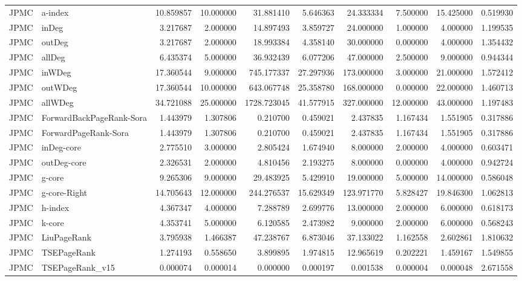 \begin{tabular}{llrrrrrrrr}
JPMC & a-index & 10.859857 & 10.000000 & 31.881410 & 5.646363 & 24.333334 & 7.500000 & 15.425000 & 0.519930 \\
JPMC & inDeg & 3.217687 & 2.000000 & 14.897493 & 3.859727 & 24.000000 & 1.000000 & 4.000000 & 1.199535 \\
JPMC & outDeg & 3.217687 & 2.000000 & 18.993384 & 4.358140 & 30.000000 & 0.000000 & 4.000000 & 1.354432 \\
JPMC & allDeg & 6.435374 & 5.000000 & 36.932439 & 6.077206 & 47.000000 & 2.500000 & 9.000000 & 0.944344 \\
JPMC & inWDeg & 17.360544 & 9.000000 & 745.177337 & 27.297936 & 173.000000 & 3.000000 & 21.000000 & 1.572412 \\
JPMC & outWDeg & 17.360544 & 10.000000 & 643.067748 & 25.358780 & 168.000000 & 0.000000 & 22.000000 & 1.460713 \\
JPMC & allWDeg & 34.721088 & 25.000000 & 1728.723045 & 41.577915 & 327.000000 & 12.000000 & 43.000000 & 1.197483 \\
JPMC & ForwardBackPageRank-Sora & 1.443979 & 1.307806 & 0.210700 & 0.459021 & 2.437835 & 1.167434 & 1.551905 & 0.317886 \\
JPMC & ForwardPageRank-Sora & 1.443979 & 1.307806 & 0.210700 & 0.459021 & 2.437835 & 1.167434 & 1.551905 & 0.317886 \\
JPMC & inDeg-core & 2.775510 & 3.000000 & 2.805424 & 1.674940 & 8.000000 & 2.000000 & 4.000000 & 0.603471 \\
JPMC & outDeg-core & 2.326531 & 2.000000 & 4.810456 & 2.193275 & 8.000000 & 0.000000 & 4.000000 & 0.942724 \\
JPMC & g-core & 9.265306 & 9.000000 & 29.483925 & 5.429910 & 19.000000 & 5.000000 & 14.000000 & 0.586048 \\
JPMC & g-core-Right & 14.705643 & 12.000000 & 244.276537 & 15.629349 & 123.971770 & 5.828427 & 19.846300 & 1.062813 \\
JPMC & h-index & 4.367347 & 4.000000 & 7.288789 & 2.699776 & 13.000000 & 2.000000 & 6.000000 & 0.618173 \\
JPMC & k-core & 4.353741 & 5.000000 & 6.120585 & 2.473982 & 9.000000 & 2.000000 & 6.000000 & 0.568243 \\
JPMC & LiuPageRank & 3.795938 & 1.466387 & 47.238767 & 6.873046 & 37.133022 & 1.162558 & 2.602861 & 1.810632 \\
JPMC & TSEPageRank & 1.274193 & 0.558650 & 3.899895 & 1.974815 & 12.965619 & 0.202221 & 1.459167 & 1.549855 \\
JPMC & TSEPageRank_v15 & 0.000074 & 0.000014 & 0.000000 & 0.000197 & 0.001538 & 0.000004 & 0.000048 & 2.671558 \\

\end{tabular}
